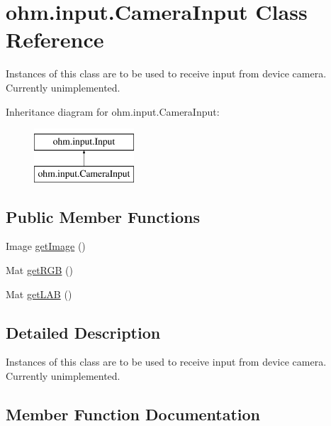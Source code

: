 \hypertarget{classohm_1_1input_1_1_camera_input}{}\section{ohm.\+input.\+Camera\+Input Class Reference}
\label{classohm_1_1input_1_1_camera_input}


Instances of this class are to be used to receive input from device camera. Currently unimplemented.  


Inheritance diagram for ohm.\+input.\+Camera\+Input\+:\begin{figure}[H]
\begin{center}
\leavevmode
\includegraphics[height=2.000000cm]{classohm_1_1input_1_1_camera_input}
\end{center}
\end{figure}
\subsection*{Public Member Functions}
\begin{DoxyCompactItemize}
\item 
Image \hyperlink{classohm_1_1input_1_1_camera_input_a5d34760a889c9e574f8e3050bde679b6}{get\+Image} ()
\item 
Mat \hyperlink{classohm_1_1input_1_1_camera_input_ad237c282f6c3367ef857d12ebb079b38}{get\+R\+GB} ()
\item 
Mat \hyperlink{classohm_1_1input_1_1_camera_input_a1cee784ad09131e95ded21d07a42c8d4}{get\+L\+AB} ()
\end{DoxyCompactItemize}


\subsection{Detailed Description}
Instances of this class are to be used to receive input from device camera. Currently unimplemented. 

\subsection{Member Function Documentation}
\hypertarget{classohm_1_1input_1_1_camera_input_a5d34760a889c9e574f8e3050bde679b6}{}\label{classohm_1_1input_1_1_camera_input_a5d34760a889c9e574f8e3050bde679b6} 
